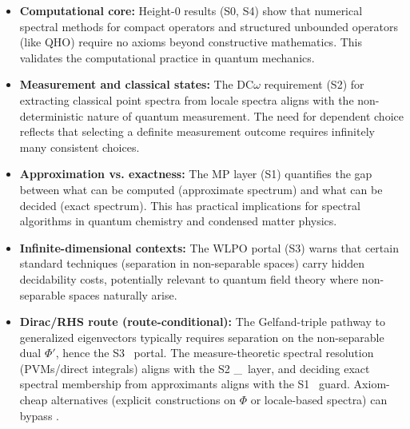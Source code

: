 \documentclass[11pt]{article}
\newcommand{\WLPO}{\mathsf{WLPO}}
\newcommand{\DCw}{\mathsf{DC}_{\omega}}
\newcommand{\MP}{\mathsf{MP}}
\theoremstyle{plain}
\theoremstyle{definition}
\theoremstyle{remark}
\begin{document}
\begin{itemize}
\item \textbf{Computational core:} Height-0 results (S0, S4) show that numerical spectral methods for compact operators and structured unbounded operators (like QHO) require no axioms beyond constructive mathematics. This validates the computational practice in quantum mechanics.

\item \textbf{Measurement and classical states:} The DC$\omega$ requirement (S2) for extracting classical point spectra from locale spectra aligns with the non-deterministic nature of quantum measurement. The need for dependent choice reflects that selecting a definite measurement outcome requires infinitely many consistent choices.

\item \textbf{Approximation vs. exactness:} The MP layer (S1) quantifies the gap between what can be computed (approximate spectrum) and what can be decided (exact spectrum). This has practical implications for spectral algorithms in quantum chemistry and condensed matter physics.

\item \textbf{Infinite-dimensional contexts:} The WLPO portal (S3) warns that certain standard techniques (separation in non-separable spaces) carry hidden decidability costs, potentially relevant to quantum field theory where non-separable spaces naturally arise.
\item \textbf{Dirac/RHS route (route-conditional):} The Gelfand-triple pathway to generalized eigenvectors typically requires separation on the non-separable dual $\Phi'$, hence the S3 \WLPO\ portal. The measure-theoretic spectral resolution (PVMs/direct integrals) aligns with the S2 \DCw\ layer, and deciding exact spectral membership from approximants aligns with the S1 \MP\ guard. Axiom-cheap alternatives (explicit constructions on $\Phi$ or locale-based spectra) can bypass \WLPO.
\end{itemize}
\end{document}
